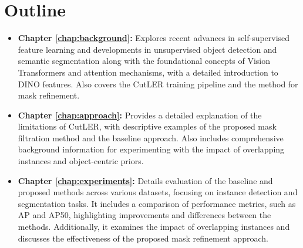 
\section{Outline}
\begin{itemize}
	 \item \textbf{Chapter \ref{chap:background}:} Explores recent advances in self-supervised feature learning and developments in unsupervised object detection and semantic segmentation along with the foundational concepts of Vision Transformers and attention mechanisms, with a detailed introduction to DINO features. Also covers the CutLER training pipeline and the method for mask refinement. 
	 
    \item \textbf{Chapter \ref{chap:approach}:} Provides a detailed explanation of the limitations of CutLER, with descriptive examples of the proposed mask filtration method and the baseline approach. Also includes comprehensive background information for experimenting with the impact of overlapping instances and object-centric priors.
    
    \item \textbf{Chapter \ref{chap:experiments}:} Details evaluation of the baseline and proposed methods across various datasets, focusing on instance detection and segmentation tasks. It includes a comparison of performance metrics, such as AP and AP50, highlighting improvements and differences between the methods. Additionally, it examines the impact of overlapping instances and discusses the effectiveness of the proposed mask refinement approach.
\end{itemize}